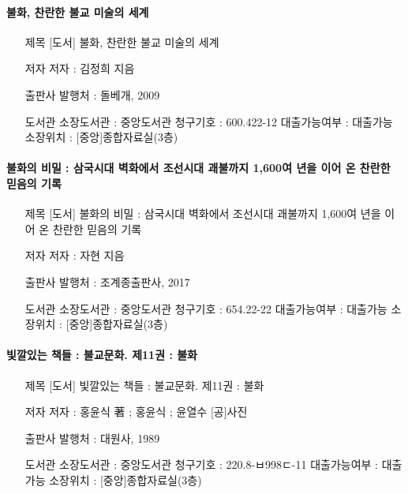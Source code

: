 \documentclass[12pt, a4paper, oneside]{book}
\begin{document}
\paragraph{ 불화, 찬란한 불교 미술의 세계 }

\begin{itemize}[					
		topsep=0.0em,			
		parsep=0.0em,			
		itemsep=0em,			
		leftmargin=	5	em,
		labelwidth=	1	em,			
		labelsep=		1	 em			
]					
	\item	[제목]	[도서] 불화, 찬란한 불교 미술의 세계	\item	[저자]	저자 : 김정희 지음	\item	[출판사]	발행처 : 돌베개, 2009	\item	[도서관]	소장도서관 : 중앙도서관	청구기호 : 600.422-12	대출가능여부 : 대출가능	소장위치 : [중앙]종합자료실(3층)

\end{itemize}					


\paragraph{불화의 비밀 : 삼국시대 벽화에서 조선시대 괘불까지 1,600여 년을 이어 온 찬란한 믿음의 기록 }

\begin{itemize}[					
		topsep=0.0em,			
		parsep=0.0em,			
		itemsep=0em,			
		leftmargin=	5	em,
		labelwidth=	1	em,			
		labelsep=		1	 em			
]					
	\item	[제목]	[도서] 불화의 비밀 : 삼국시대 벽화에서 조선시대 괘불까지 1,600여 년을 이어 온 찬란한 믿음의 기록	\item	[저자]	저자 : 자현 지음	\item	[출판사]	발행처 : 조계종출판사, 2017	\item	[도서관]	소장도서관 : 중앙도서관	청구기호 : 654.22-22	대출가능여부 : 대출가능	소장위치 : [중앙]종합자료실(3층)

\end{itemize}					


\paragraph{빛깔있는 책들 : 불교문화. 제11권 : 불화 }

\begin{itemize}[					
		topsep=0.0em,			
		parsep=0.0em,			
		itemsep=0em,			
		leftmargin=	5	em,
		labelwidth=	1	em,			
		labelsep=		1	 em			
]					
	\item	[제목]	[도서] 빛깔있는 책들 : 불교문화. 제11권 : 불화	\item	[저자]	저자 : 홍윤식 著 ; 홍윤식 ; 윤열수 [공]사진	\item	[출판사]	발행처 : 대원사, 1989	\item	[도서관]	소장도서관 : 중앙도서관	청구기호 : 220.8-ㅂ998ㄷ-11	대출가능여부 : 대출가능	소장위치 : [중앙]종합자료실(3층)

\end{itemize}					
\end{document}
